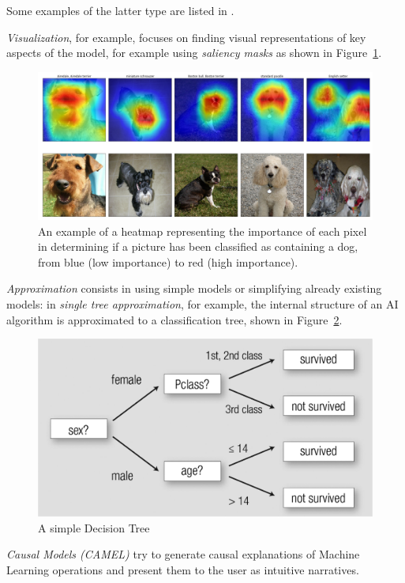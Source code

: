 \documentclass[conference]{IEEEtran}
\begin{document}
Some examples of the latter type are listed in \citet{nasaxai}.

\textit{Visualization}, for example, focuses on finding visual representations
of key aspects of the model, for example using \textit{saliency masks} as shown
in Figure~\ref{fig:heatmap}.

\begin{figure}[h!] \centering
    \includegraphics[width=0.9\linewidth]{images/dog_localization.png}
    \caption{An example of a heatmap representing the importance of each pixel
        in determining if a picture has been classified as containing a dog, from
        blue (low importance) to red (high importance). } \label{fig:heatmap}
\end{figure}

\textit{Approximation} consists in using simple models or simplifying already
existing models: in \textit{single tree approximation}, for example, the
internal structure of an AI algorithm is approximated to a classification tree,
shown in Figure~\ref{fig:dectree}.

\begin{figure}[ht!] \centering
    \includegraphics[width=0.9\linewidth]{images/dectree} \caption{A simple
        Decision Tree} \label{fig:dectree} \end{figure}

\textit{Causal Models (CAMEL)} try to generate causal explanations of Machine
Learning operations and present them to the user as intuitive narratives.
\end{document}
